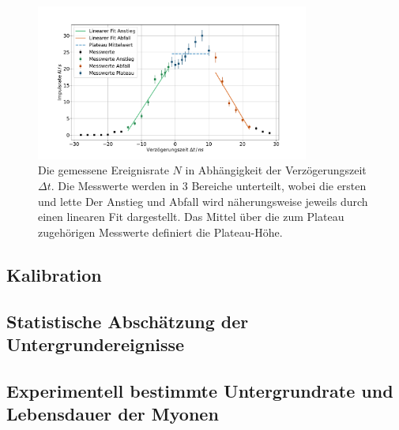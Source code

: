 \begin{figure}
    \centering
    \includegraphics[width=0.8\textwidth]{content/plots/verzoegerungszeit.pdf}
    \caption{Die gemessene Ereignisrate $N$ in Abhängigkeit der Verzögerungszeit $\Delta t$.
    Die Messwerte werden in 3 Bereiche unterteilt, wobei die ersten und lette
    Der Anstieg und Abfall wird näherungsweise jeweils durch einen linearen Fit dargestellt.
    Das Mittel über die zum Plateau zugehörigen Messwerte definiert die Plateau-Höhe.}
    \label{fig:verzoegerung}
\end{figure}

\subsection{Kalibration}

\subsection{Statistische Abschätzung der Untergrundereignisse}

\subsection{Experimentell bestimmte Untergrundrate und Lebensdauer der Myonen}